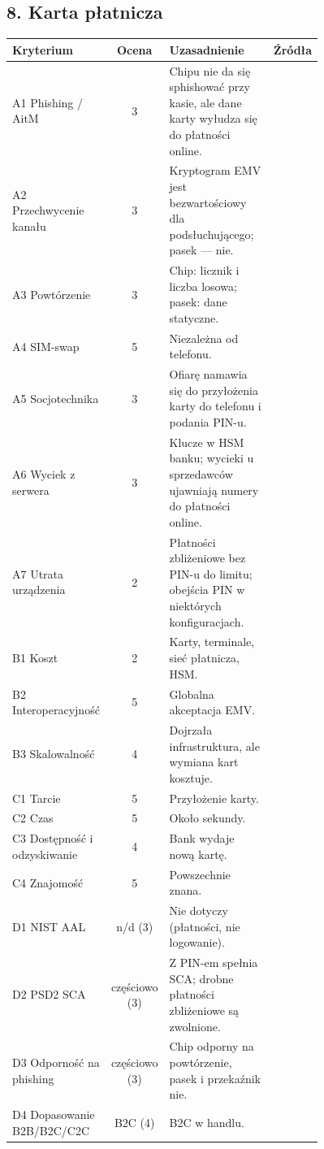 \subsection*{8. Karta płatnicza}
\begingroup\small
\begin{longtable}{@{}p{0.2\linewidth}c p{0.56\linewidth}l@{}}
\toprule
Kryterium & Ocena & Uzasadnienie & Źródła \\
\midrule
\endhead
A1 Phishing / AitM & 3 & Chipu nie da się sphishować przy kasie, ale dane karty wyłudza się do płatności online. & \cite{A6,S5} \\
A2 Przechwycenie kanału & 3 & Kryptogram EMV jest bezwartościowy dla podsłuchującego; pasek — nie. & \cite{A9,A8} \\
A3 Powtórzenie & 3 & Chip: licznik i liczba losowa; pasek: dane statyczne. & \cite{A6,A8} \\
A4 SIM-swap & 5 & Niezależna od telefonu. & \cite{S5} \\
A5 Socjotechnika & 3 & Ofiarę namawia się do przyłożenia karty do telefonu i podania PIN-u. & \cite{X6} \\
A6 Wyciek z serwera & 3 & Klucze w HSM banku; wycieki u sprzedawców ujawniają numery do płatności online. & \cite{A6} \\
A7 Utrata urządzenia & 2 & Płatności zbliżeniowe bez PIN-u do limitu; obejścia PIN w niektórych konfiguracjach. & \cite{A4,A6} \\
B1 Koszt & 2 & Karty, terminale, sieć płatnicza, HSM. & \cite{S5,A6} \\
B2 Interoperacyjność & 5 & Globalna akceptacja EMV. & \cite{S5} \\
B3 Skalowalność & 4 & Dojrzała infrastruktura, ale wymiana kart kosztuje. & \cite{S5} \\
C1 Tarcie & 5 & Przyłożenie karty. & \cite{S5} \\
C2 Czas & 5 & Około sekundy. & \cite{S5} \\
C3 Dostępność i odzyskiwanie & 4 & Bank wydaje nową kartę. & \cite{S5} \\
C4 Znajomość & 5 & Powszechnie znana. & \cite{S5} \\
D1 NIST AAL & n/d (3) & Nie dotyczy (płatności, nie logowanie). & \cite{N1} \\
D2 PSD2 SCA & częściowo (3) & Z PIN-em spełnia SCA; drobne płatności zbliżeniowe są zwolnione. & \cite{N3} \\
D3 Odporność na phishing & częściowo (3) & Chip odporny na powtórzenie, pasek i przekaźnik nie. & \cite{A5,A6} \\
D4 Dopasowanie B2B/B2C/C2C & B2C (4) & B2C w handlu. & \cite{S5,N7} \\
\bottomrule
\end{longtable}
\endgroup

